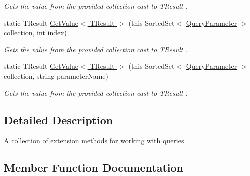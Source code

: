 \begin{DoxyCompactItemize}
\begin{DoxyCompactList}\small\item\em Gets the value from the provided {\itshape collection}  cast to {\itshape T\+Result} . \end{DoxyCompactList}\item 
static T\+Result \hyperlink{classCqrs_1_1Repositories_1_1Queries_1_1QueryPredicateExtensions_a8544c5998b585aac97320e4205093ba3_a8544c5998b585aac97320e4205093ba3}{Get\+Value$<$ T\+Result $>$} (this Sorted\+Set$<$ \hyperlink{classCqrs_1_1Repositories_1_1Queries_1_1QueryParameter}{Query\+Parameter} $>$ collection, int index)
\begin{DoxyCompactList}\small\item\em Gets the value from the provided {\itshape collection}  cast to {\itshape T\+Result} . \end{DoxyCompactList}\item 
static T\+Result \hyperlink{classCqrs_1_1Repositories_1_1Queries_1_1QueryPredicateExtensions_a8ede744015309723a289ace4795ba14a_a8ede744015309723a289ace4795ba14a}{Get\+Value$<$ T\+Result $>$} (this Sorted\+Set$<$ \hyperlink{classCqrs_1_1Repositories_1_1Queries_1_1QueryParameter}{Query\+Parameter} $>$ collection, string parameter\+Name)
\begin{DoxyCompactList}\small\item\em Gets the value from the provided {\itshape collection}  cast to {\itshape T\+Result} . \end{DoxyCompactList}\end{DoxyCompactItemize}


\subsection{Detailed Description}
A collection of extension methods for working with queries. 



\subsection{Member Function Documentation}
\mbox{\label{classCqrs_1_1Repositories_1_1Queries_1_1QueryPredicateExtensions_aa76dc536f915299de4743ac9b801433d_aa76dc536f915299de4743ac9b801433d}} 

